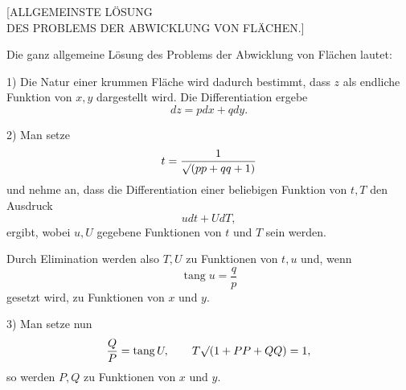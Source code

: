 \clearpage
{}
\begin{center}\large [ALLGEMEINSTE LÖSUNG\\DES PROBLEMS DER ABWICKLUNG VON FLÄCHEN.]\end{center}
\noindent\hspace*{1.2em}Die ganz allgemeine Lösung des Problems der Abwicklung von Flächen lautet:

1) Die Natur einer krummen Fläche wird dadurch bestimmt, dass $z$ als endliche Funktion von $x,y$ dargestellt wird. Die Differentiation ergebe
\[
dz=pdx+qdy.
\]

2) Man setze
\[
t=\frac{1}{\mathord{\surd}(pp+qq+1)}
\]
\noindent und nehme an, dass die Differentiation einer beliebigen Funktion von $t,T$ den Ausdruck
\[
udt+UdT,
\]
\noindent ergibt, wobei $u,U$ gegebene Funktionen von $t$ und $T$ sein werden.

Durch Elimination werden also $T,U$ zu Funktionen von $t,u$ und, wenn
\[
\operatorname{tang}u=\frac{q}{p}
\]
\noindent gesetzt wird, zu Funktionen von $x$ und $y$.

3) Man setze nun
\[
\frac{Q}{P}=\operatorname{tang}U,\qquad
T\mathord{\surd}(1+PP+QQ)=1,
\]
\noindent so werden $P,Q$ zu Funktionen von $x$ und $y$.

